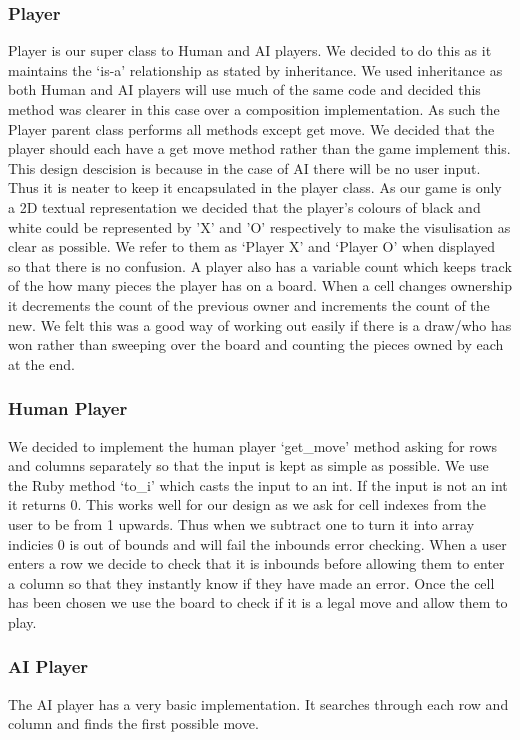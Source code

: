 \documentclass[a4wide, 11pt]{article}
\begin{document}
  \subsubsection{Player}
  Player is our super class to Human and AI players. We decided to do this as it maintains the `is-a' relationship as stated by inheritance. We used inheritance as 
  both Human and AI players will use much of the same code and decided this method was clearer in this case over a composition implementation. \cite{compvsinher} As such the Player 
  parent class performs all methods except get move. We decided that the player should each have a get move method rather than the game implement this.
  This design descision is because in the case of AI there will be no user input. Thus it is neater to keep it encapsulated in the player class.
  As our game is only a 2D textual representation we decided that the player's colours of black and white could be represented by 'X' and 'O' respectively
  to make the visulisation as clear as possible. We refer to them as `Player X' and `Player O' when displayed so that there is no confusion. A player also has a 
  variable count which keeps track of the how many pieces the player has on a board. When a cell changes ownership it decrements the count of the previous owner
  and increments the count of the new. We felt this was a good way of working out easily if there is a draw/who has won rather than sweeping over the board and 
  counting the pieces owned by each at the end.

  \subsubsection{Human Player}
  We decided to implement the human player `get_move' method asking for rows and columns separately so that the input is kept as simple as possible. We use the Ruby 
  method `to\_i' which casts the input to an int. If the input is not an int it returns 0. This works well for our design as we ask for cell indexes from the user
  to be from 1 upwards. Thus when we subtract one to turn it into array indicies 0 is out of bounds and will fail the inbounds error checking. When a user enters
  a row we decide to check that it is inbounds before allowing them to enter a column so that they instantly know if they have made an error. Once the cell has
  been chosen we use the board to check if it is a legal move and allow them to play.
  \subsubsection{AI Player}
  The AI player has a very basic implementation. It searches through each row and column and finds the first possible move. 
\end{document}
